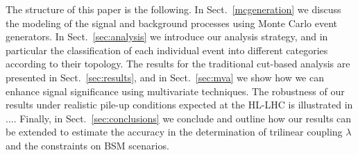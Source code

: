  
The structure of this paper is the following.
%
In Sect.~\ref{mcgeneration} we discuss the modeling of the signal
and background processes using Monte Carlo event generators.
%
In Sect.~\ref{sec:analysis}
we introduce our analysis strategy, and in particular
the classification of each individual event into
different categories according to their topology.
%
The results for the traditional cut-based analysis
are presented in Sect.~\ref{sec:results}, and in
Sect.~\ref{sec:mva} we show how we can enhance signal
significance using multivariate techniques.
%
The robustness of our results under realistic pile-up
conditions expected at the HL-LHC is illustrated in
....
%
Finally, in Sect.~\ref{sec:conclusions} we conclude and outline
how our results can be extended to estimate the accuracy
in the determination of trilinear coupling $\lambda$ and the constraints on
BSM scenarios.
